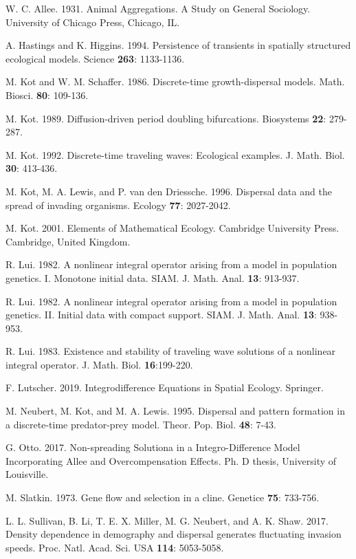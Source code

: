 \documentclass[11pt]{article}
\theoremstyle{definition}
\numberwithin{equation}{section}
\numberwithin{thm}{section}
\begin{document}
\begin{thebibliography}{9}
 W. C. Allee. 1931.
Animal Aggregations. A Study on General Sociology.
University of Chicago Press, Chicago, IL.

 A. Hastings and K. Higgins. 1994.
Persistence of transients in spatially structured ecological models.
Science {\bf 263}: 1133-1136.

 M. Kot and W. M. Schaffer. 1986.
Discrete-time growth-dispersal models.
Math. Biosci. {\bf 80}: 109-136.

 M. Kot. 1989.
Diffusion-driven period doubling bifurcations.
Biosystems {\bf 22}: 279-287.

 M. Kot. 1992.
Discrete-time traveling waves: Ecological examples.
J. Math. Biol. {\bf 30}: 413-436.

 M. Kot, M. A. Lewis, and P. van den Driessche. 1996.
Dispersal data and the spread of invading organisms.
Ecology {\bf 77}: 2027-2042.

 M. Kot. 2001.
Elements of Mathematical Ecology.
Cambridge University Press. Cambridge, United Kingdom.

 R. Lui. 1982.
A nonlinear integral operator arising from a model in population genetics. I. Monotone initial data.
SIAM. J. Math. Anal. {\bf 13}: 913-937.

 R. Lui. 1982.
A nonlinear integral operator arising from a model in population genetics. II. Initial data with compact support.
SIAM. J. Math. Anal. {\bf 13}: 938-953.

 R. Lui. 1983.
Existence and stability of traveling wave solutions of a nonlinear integral operator.
J. Math. Biol. {\bf 16}:199-220.

 F. Lutscher. 2019.
Integrodifference Equations in Spatial Ecology.
Springer.

 M. Neubert, M. Kot, and M. A. Lewis. 1995.
Dispersal and pattern formation in a discrete-time predator-prey model.
Theor. Pop. Biol. {\bf 48}: 7-43.

 G. Otto. 2017.
Non-spreading Solutiona in a Integro-Difference Model Incorporating Allee and Overcompensation Effects.
Ph. D thesis, University of Louisville.

 M. Slatkin. 1973.
Gene flow and selection in a cline.
Genetice {\bf 75}: 733-756.

 L. L. Sullivan, B. Li, T. E. X. Miller, M. G. Neubert, and A. K. Shaw. 2017.
Density dependence in demography and dispersal generates fluctuating invasion speeds. Proc. Natl. Acad. Sci. USA {\bf
114}: 5053-5058.


\end{thebibliography}
\end{document}
